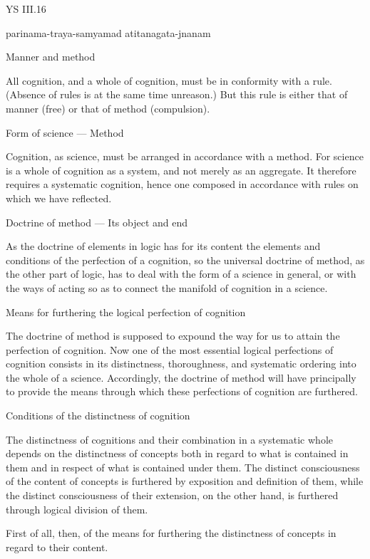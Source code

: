 YS III.16

    parinama-traya-samyamad atitanagata-jnanam

    Manner and method

    All cognition, and a whole of cognition, must be in conformity with a rule.
    (Absence of rules is at the same time unreason.)
    But this rule is either that of manner (free) or that of method (compulsion).

    Form of science — Method

    Cognition, as science, must be arranged in accordance with a method.
    For science is a whole of cognition as a system, and not merely as an aggregate.
    It therefore requires a systematic cognition, hence one composed
    in accordance with rules on which we have reflected.

    Doctrine of method — Its object and end

    As the doctrine of elements in logic has for its content
    the elements and conditions of the perfection of a cognition,
    so the universal doctrine of method, as the other part of logic,
    has to deal with the form of a science in general,
    or with the ways of acting so as to connect
    the manifold of cognition in a science.

    Means for furthering the logical perfection of cognition

    The doctrine of method is supposed to expound the way
    for us to attain the perfection of cognition.
    Now one of the most essential logical perfections of cognition consists in its
    distinctness, thoroughness, and systematic ordering into the whole of a science.
    Accordingly, the doctrine of method will have principally to provide
    the means through which these perfections of cognition are furthered.

    Conditions of the distinctness of cognition

    The distinctness of cognitions and their combination
    in a systematic whole depends on the distinctness of concepts
    both in regard to what is contained in them
    and in respect of what is contained under them.
    The distinct consciousness of the content of concepts is furthered
    by exposition and definition of them,
    while the distinct consciousness of their extension, on the other hand,
    is furthered through logical division of them.

    First of all, then, of the means for furthering the distinctness of concepts
    in regard to their content.

